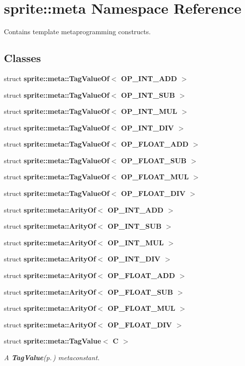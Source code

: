 \section{sprite::meta Namespace Reference}
\label{namespacesprite_1_1meta}
Contains template metaprogramming constructs.  


\subsection*{Classes}
\begin{CompactItemize}
\item 
struct {\bf sprite::meta::Tag\-Value\-Of$<$ OP\_\-INT\_\-ADD $>$}
\item 
struct {\bf sprite::meta::Tag\-Value\-Of$<$ OP\_\-INT\_\-SUB $>$}
\item 
struct {\bf sprite::meta::Tag\-Value\-Of$<$ OP\_\-INT\_\-MUL $>$}
\item 
struct {\bf sprite::meta::Tag\-Value\-Of$<$ OP\_\-INT\_\-DIV $>$}
\item 
struct {\bf sprite::meta::Tag\-Value\-Of$<$ OP\_\-FLOAT\_\-ADD $>$}
\item 
struct {\bf sprite::meta::Tag\-Value\-Of$<$ OP\_\-FLOAT\_\-SUB $>$}
\item 
struct {\bf sprite::meta::Tag\-Value\-Of$<$ OP\_\-FLOAT\_\-MUL $>$}
\item 
struct {\bf sprite::meta::Tag\-Value\-Of$<$ OP\_\-FLOAT\_\-DIV $>$}
\item 
struct {\bf sprite::meta::Arity\-Of$<$ OP\_\-INT\_\-ADD $>$}
\item 
struct {\bf sprite::meta::Arity\-Of$<$ OP\_\-INT\_\-SUB $>$}
\item 
struct {\bf sprite::meta::Arity\-Of$<$ OP\_\-INT\_\-MUL $>$}
\item 
struct {\bf sprite::meta::Arity\-Of$<$ OP\_\-INT\_\-DIV $>$}
\item 
struct {\bf sprite::meta::Arity\-Of$<$ OP\_\-FLOAT\_\-ADD $>$}
\item 
struct {\bf sprite::meta::Arity\-Of$<$ OP\_\-FLOAT\_\-SUB $>$}
\item 
struct {\bf sprite::meta::Arity\-Of$<$ OP\_\-FLOAT\_\-MUL $>$}
\item 
struct {\bf sprite::meta::Arity\-Of$<$ OP\_\-FLOAT\_\-DIV $>$}
\item 
struct {\bf sprite::meta::Tag\-Value$<$ C $>$}
\begin{CompactList}\small\item\em A {\bf Tag\-Value}{\rm (p.\,\pageref{structsprite_1_1meta_1_1TagValue})} metaconstant. \item\end{CompactList}\item 

\end{CompactItemize}
